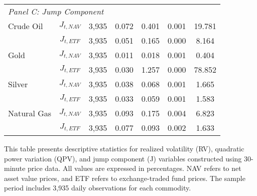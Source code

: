\begin{table}[htbp]
\begin{threeparttable}
\begin{tabular}{@{}lcccccc@{}}
\multicolumn{7}{l}{\textit{Panel C: Jump Component}} \\
\addlinespace[0.1cm]
Crude Oil & $J_{t,NAV}$ & 3,935 & 0.072 & 0.401 & 0.001 & 19.781 \\
          & $J_{t,ETF}$ & 3,935 & 0.051 & 0.165 & 0.000 & 8.164 \\
\addlinespace[0.05cm]
Gold      & $J_{t,NAV}$ & 3,935 & 0.011 & 0.018 & 0.001 & 0.404 \\
          & $J_{t,ETF}$ & 3,935 & 0.030 & 1.257 & 0.000 & 78.852 \\
\addlinespace[0.05cm]
Silver    & $J_{t,NAV}$ & 3,935 & 0.038 & 0.068 & 0.001 & 1.665 \\
          & $J_{t,ETF}$ & 3,935 & 0.033 & 0.059 & 0.001 & 1.583 \\
\addlinespace[0.05cm]
Natural Gas & $J_{t,NAV}$ & 3,935 & 0.093 & 0.175 & 0.004 & 6.823 \\
            & $J_{t,ETF}$ & 3,935 & 0.077 & 0.093 & 0.002 & 1.633 \\
\bottomrule
\end{tabular}
\begin{tablenotes}
\small
\item This table presents descriptive statistics for realized volatility (RV), quadratic power variation (QPV), and jump component (J) variables constructed using 30-minute price data. All values are expressed in percentages. NAV refers to net asset value prices, and ETF refers to exchange-traded fund prices. The sample period includes 3,935 daily observations for each commodity.
\end{tablenotes}
\end{threeparttable}
\end{table}





